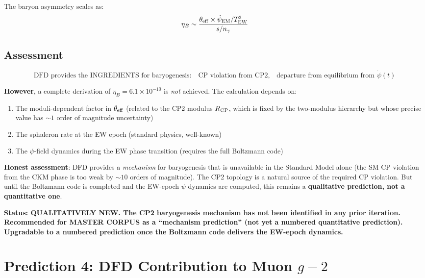 \documentclass[11pt]{article}
\begin{document}
The baryon asymmetry scales as:
\begin{equation}
\eta_B \sim \frac{\theta_{\rm eff} \times \dot\psi_{\rm EM}/T_{\rm EW}^3}{s/n_\gamma}
\end{equation}

\subsection{Assessment}

\begin{equation}
\boxed{
\text{DFD provides the INGREDIENTS for baryogenesis:}
\quad\text{CP violation from CP2,}
\quad\text{departure from equilibrium from } \dot\psi(t)
}
\end{equation}

\textbf{However}, a complete derivation of $\eta_B = 6.1 \times 10^{-10}$
is \emph{not} achieved.  The calculation depends on:
\begin{enumerate}
\item The moduli-dependent factor in $\theta_{\rm eff}$ (related to the
  CP2 modulus $R_{\rm CP}$, which is fixed by the two-modulus hierarchy
  but whose precise value has $\sim 1$ order of magnitude uncertainty)
\item The sphaleron rate at the EW epoch (standard physics, well-known)
\item The $\psi$-field dynamics during the EW phase transition
  (requires the full Boltzmann code)
\end{enumerate}

\textbf{Honest assessment}: DFD provides a \emph{mechanism} for
baryogenesis that is unavailable in the Standard Model alone (the SM
CP violation from the CKM phase is too weak by $\sim 10$ orders of
magnitude).  The CP2 topology is a natural source of the required CP
violation.  But until the Boltzmann code is completed and the EW-epoch
$\psi$ dynamics are computed, this remains a \textbf{qualitative
prediction, not a quantitative one}.

\textbf{Status: QUALITATIVELY NEW.  The CP2 baryogenesis mechanism
has not been identified in any prior iteration.  Recommended for
MASTER CORPUS as a ``mechanism prediction'' (not yet a numbered
quantitative prediction).  Upgradable to a numbered prediction
once the Boltzmann code delivers the EW-epoch dynamics.}

\section{Prediction 4: DFD Contribution to Muon $g-2$}
\label{sec:muon-g2}
\end{document}
